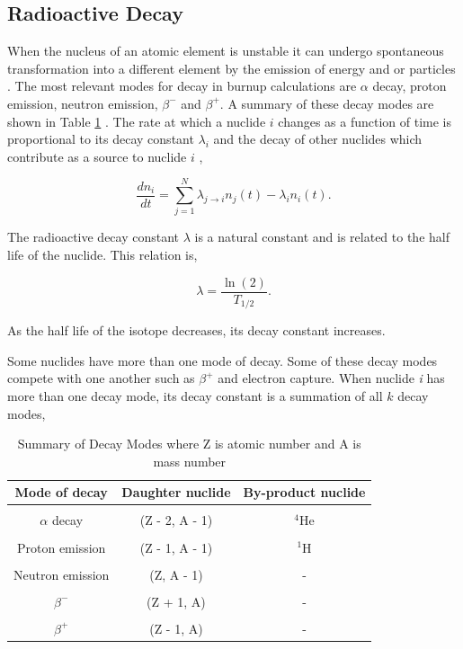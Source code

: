 \subsection{Radioactive Decay}
When the nucleus of an atomic element is unstable it can undergo spontaneous transformation into a different element by the emission of energy and or particles \cite{duderstadt1976}. The most relevant modes for decay in burnup calculations are $\alpha$ decay, proton emission, neutron emission, $\beta^{-}$ and $\beta^{+}$. A summary of these decay modes are shown in Table \ref{tab:decayModes} \cite{pusaThesis}. The rate at which a nuclide $i$ changes as a function of time is proportional to its decay constant $\lambda_{i}$ and the decay of other nuclides which contribute as a source to nuclide $i$  \cite{duderstadt1976}, 

\begin{equation}
    \frac{dn_{i}}{dt} = \sum_{j=1}^{N} \lambda_{j\rightarrow i}n_{j}(t) -\lambda_{i} n_{i}(t).
    \label{eq:decaySingleMode}
\end{equation}

\noindent The radioactive decay constant $\lambda$ is a natural constant and is related to the half life of the nuclide. This relation is,

\begin{equation}
    \lambda = \frac{\ln(2)}{T_{1/2}}.
\end{equation}

\noindent As the half life of the isotope decreases, its decay constant increases. 

Some nuclides have more than one mode of decay. Some of these decay modes compete with one another such as $\beta^{+}$ and electron capture. When nuclide \textit{i} has more than one decay mode, its decay constant is a summation of all $k$ decay modes,

\clearpage

\begin{table}[t]
    \caption{\label{tab:decayModes} Summary of Decay Modes where Z is atomic number and A is mass number \cite{pusaThesis}}
    \centering
    \begin{tabular}{c|c|c}
    \hline
    \textbf{Mode of decay} & \textbf{Daughter nuclide} & \textbf{By-product nuclide} \\ [0.5ex] 
    \hline
    \hline
    \\ [-1em]
    $\alpha$ decay & (Z - 2, A - 1) & ${}^{4}$He \\ \hline 
    \\ [-1em]
    Proton emission & (Z - 1, A - 1) & ${}^{1}$H \\ \hline
    \\ [-1em]
    Neutron emission & (Z, A - 1) & - \\ \hline
    \\ [-1em]
    $\beta^{-}$ & (Z + 1, A) & - \\ \hline
    \\ [-1em]
    $\beta^{+}$ & (Z - 1, A) & - \\ \hline
    \end{tabular}
\end{table}

